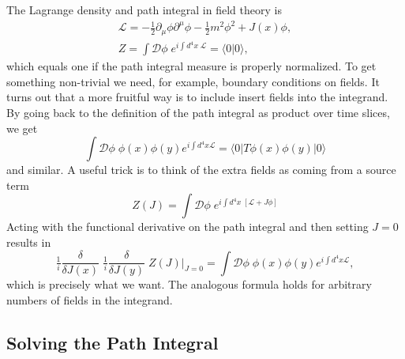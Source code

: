 \documentclass[12pt]{article}
\begin{document}
The Lagrange density and path integral in field theory is
\begin{equation}
  \begin{gathered}
    \mathcal{L} = -\frac{1}{2} \partial_\mu \phi \partial^\mu \phi
    - \frac{1}{2} m^2 \phi^2 + J(x) \phi,
    \\
    Z = \int \mathcal{D}\phi \;
    e^{i\int d^4x \; \mathcal{L}} =
    \langle 0 | 0 \rangle,
  \end{gathered}
\end{equation}
which equals one if the path integral measure is properly
normalized. To get something non-trivial we need, for example,
boundary conditions on fields. It turns out that a more fruitful way
is to include insert fields into the integrand. By going back to the
definition of the path integral as product over time slices, we get
\begin{equation}
  \int \mathcal{D}\phi \;
  \phi(x) \phi(y) e^{i\int d^4x \mathcal{L}} =
  \langle 0 | T \phi(x) \phi(y) |0\rangle
\end{equation}
and similar. A useful trick is to think of the extra fields as coming
from a source term
\begin{equation}
  Z(J) = 
  \int \mathcal{D}\phi \;
  e^{i\int d^4x \; [\mathcal{L} + J \phi]}
\end{equation}
Acting with the functional derivative on the path integral and then
setting $J=0$ results in 
\begin{equation}
  \tfrac{1}{i} \frac{\delta}{\delta J(x)} \;
  \tfrac{1}{i} \frac{\delta}{\delta J(y)} \;
  Z(J)|_{J=0} =
  \int \mathcal{D}\phi \;
  \phi(x) \phi(y) e^{i\int d^4x \mathcal{L}},
\end{equation}
which is precisely what we want. The analogous formula holds for
arbitrary numbers of fields in the integrand.


\subsection{Solving the Path Integral}
\end{document}
